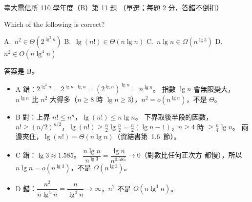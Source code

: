 \begin{pastexam}[label={px:ntu-110-comm-dsa-11}]{臺大電信所 110 學年度（B）第 11 題}
（單選；每題 2 分，答錯不倒扣）

Which of the following is correct?

A.~$n^2\in\Theta(2^{\lg^2 n})$ \qquad B.~$\lg(n!)\in\Theta(n\lg n)$ \qquad C.~$n\lg n\in\Omega(n^{\lg 3})$ \qquad D.~$n^2\in O(n\lg^4 n)$
\end{pastexam}

\begin{pastsoln}
答案是 B。
\begin{itemize}
\item A 錯：$2^{\lg^2 n} = 2^{\lg n \cdot \lg n} = (2^{\lg n})^{\lg n} = n^{\lg n}$。 指數 $\lg n$ 會無限變大，
$n^{\lg n}$ 比 $n^2$ 大得多（$n \ge 8$ 時 $\lg n \ge 3$），$n^2 = o(n^{\lg n})$，不是 $\Theta$。
\item B 對：上界 $n! \le n^n$，$\lg(n!) \le n\lg n$。 下界取後半段的因數，
$n! \ge (n/2)^{n/2}$，$\lg(n!) \ge \tfrac{n}{2}\lg\tfrac{n}{2} = \tfrac{n}{2}(\lg n - 1)$，$n \ge 4$ 時
$\ge \tfrac{n}{4}\lg n$。 兩邊夾住，$\lg(n!) = \Theta(n\lg n)$（資結書第~1.6~節）。
\item C 錯：$\lg 3 \approx 1.585$。 $\dfrac{n\lg n}{n^{\lg 3}} = \dfrac{\lg n}{n^{0.585}} \to 0$（對數比任何正次方
都慢），所以 $n\lg n = o(n^{\lg 3})$，不是 $\Omega(n^{\lg 3})$。
\item D 錯：$\dfrac{n^2}{n\lg^4 n} = \dfrac{n}{\lg^4 n} \to \infty$，$n^2$ 不是 $O(n\lg^4 n)$。
\end{itemize}
\end{pastsoln}

